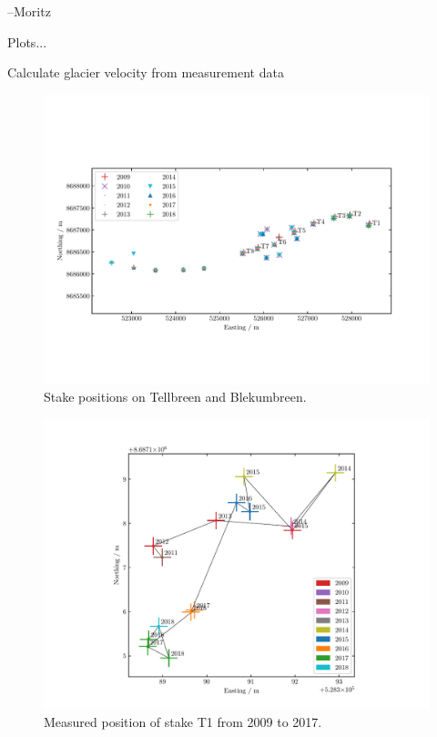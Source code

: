--Moritz


Plots...

Calculate glacier velocity from measurement data

\begin{figure}[H]
    \centering
    \includegraphics[width=\textwidth]{../fig/stakePositions.pdf}
    \caption{Stake positions on Tellbreen and Blekumbreen.}
    \label{GF:fig:stakepos}
\end{figure}



\begin{figure}[H]
    \centering
    \includegraphics[width=\textwidth]{../fig/T1_2d.pdf}
    \caption{Measured position of stake T1 from 2009 to 2017.}
    \label{GF:fig:stakepos}
\end{figure}
